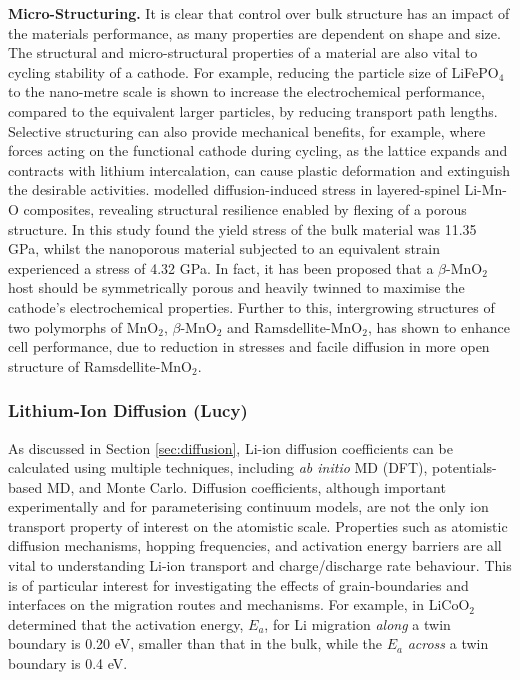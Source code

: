 \documentclass[../main.tex]{subfiles}
\begin{document}
\textbf{Micro-Structuring.} It is clear that control over bulk structure has an impact of the materials performance, as many properties are dependent on shape and size. \cite{bruce2008nanomaterials} The structural and micro-structural properties of a material are also vital to cycling stability of a cathode. For example, reducing the particle size of LiFePO$_4$ to the nano-metre scale is shown to increase the electrochemical performance, compared to the equivalent larger particles, by reducing transport path lengths. \cite{franger2006chemistry, ellis2007synthesis,malik2010particle} Selective structuring can also provide mechanical benefits, for example, where forces acting on the functional cathode during cycling, as the lattice expands and contracts with lithium intercalation, can cause plastic deformation and extinguish the desirable activities. \citeauthor{sayle2018stress} modelled diffusion-induced stress in layered-spinel Li-Mn-O composites, revealing structural resilience enabled by flexing of a porous structure. \cite{sayle2018stress} In this study \citeauthor{sayle2018stress} found the yield stress of the bulk material was 11.35 GPa, whilst the nanoporous material subjected to an equivalent strain experienced a stress of 4.32 GPa. In fact, it has been proposed that a $\beta$-MnO$_2$ host should be symmetrically porous and heavily twinned to maximise the cathode's electrochemical properties. \cite{sayle2009predicting} Further to this, intergrowing structures of two polymorphs of MnO$_2$, $\beta$-MnO$_2$ and Ramsdellite-MnO$_2$,\cite{Gupta2018} has shown to enhance cell performance,\cite{GUPTA2020227619} due to reduction in stresses and facile diffusion in more open structure of Ramsdellite-MnO$_2$.

\subsubsection{Lithium-Ion Diffusion (Lucy)}
\label{sec:cathode_ion_diffusion}
As discussed in Section \ref{sec:diffusion}, Li-ion diffusion coefficients can be calculated using multiple techniques, including \textit{ab initio} MD (DFT), potentials-based MD, and Monte Carlo. Diffusion coefficients, although important experimentally and for parameterising continuum models, are not the only ion transport property of interest on the atomistic scale. Properties such as atomistic diffusion mechanisms, hopping frequencies, and activation energy barriers are all vital to understanding Li-ion transport and charge/discharge rate behaviour. This is of particular interest for investigating the effects of grain-boundaries and interfaces on the migration routes and mechanisms. For example, in LiCoO$_2$ \citeauthor{moriwake2013first} determined that the activation energy, $E_a$, for Li migration \textit{along} a twin boundary is 0.20 eV, smaller than that in the bulk, while the $E_a$ \textit{across} a twin boundary is 0.4 eV. \cite{moriwake2013first}
\end{document}

